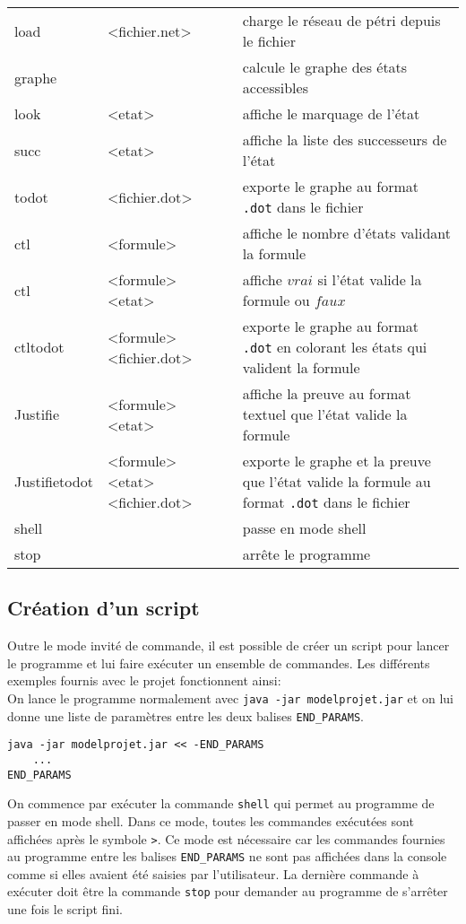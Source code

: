 \documentclass[dvipsnames]{report}
\begin{document}
\noindent\begin{tabularx}{\linewidth}{@{}l l X@{}}
load & <fichier.net> & charge le réseau de pétri depuis le fichier \\
graphe & & calcule le graphe des états accessibles \\
look & <etat> & affiche le marquage de l'état \\
succ & <etat> & affiche la liste des successeurs de l'état \\
todot & <fichier.dot> & exporte le graphe au format \texttt{.dot} dans le fichier \\
ctl & <formule> & affiche le nombre d'états validant la formule \\
ctl & <formule> <etat> & affiche $vrai$ si l'état valide la formule ou $faux$ \\
ctltodot & <formule> <fichier.dot> & exporte le graphe au format \texttt{.dot} en colorant les états qui valident la formule \\
Justifie & <formule> <etat> & affiche la preuve au format textuel que l'état valide la formule \\
Justifietodot & <formule> <etat> <fichier.dot> & exporte le graphe et la preuve que l'état valide la formule au format \texttt{.dot} dans le fichier \\
shell & & passe en mode shell \\
stop & & arrête le programme \\
\end{tabularx}

\subsection{Création d'un script}

Outre le mode invité de commande, il est possible de créer un script pour lancer le programme et lui faire exécuter un ensemble de commandes. Les différents exemples fournis avec le projet fonctionnent ainsi:\\

On lance le programme normalement avec \texttt{java -jar modelprojet.jar} et on lui donne une liste de paramètres entre les deux balises \texttt{END\_PARAMS}.
\begin{verbatim}
java -jar modelprojet.jar << -END_PARAMS
    ...
END_PARAMS
\end{verbatim}

On commence par exécuter la commande \texttt{shell} qui permet au programme de passer en mode shell. Dans ce mode, toutes les commandes exécutées sont affichées après le symbole \texttt{>}. Ce mode est nécessaire car les commandes fournies au programme entre les balises \texttt{END\_PARAMS} ne sont pas affichées dans la console comme si elles avaient été saisies par l'utilisateur. La dernière commande à exécuter doit être la commande \texttt{stop} pour demander au programme de s'arrêter une fois le script fini.
\end{document}

